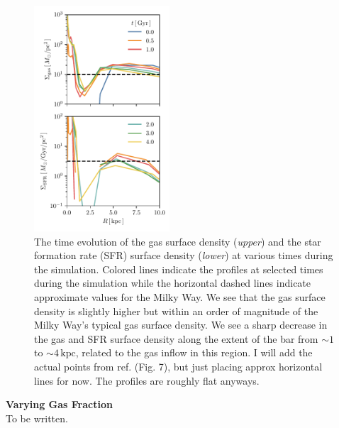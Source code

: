 \documentclass{natureprintstyle}
\begin{document}
\begin{figure}[t!]%
\centering
\includegraphics[width=0.45\textwidth]{fig/fig-surf.pdf}
\caption{The time evolution of the gas surface density (\textit{upper}) and
the star formation rate (SFR) surface density (\textit{lower}) at various
times during the simulation. Colored lines indicate the profiles at selected
times during the simulation while the horizontal dashed lines indicate
approximate values for the Milky Way.\cite{2012ARAA..50..531K} We see that the
gas surface density is slightly higher but within an order of magnitude of the
Milky Way's typical gas surface density. We see a sharp decrease in the gas
and SFR surface density along the extent of the bar from $\sim1$ to
$\sim4\,\textrm{kpc}$, related to the gas inflow in this region. {\color{red}
I will add the actual points from ref.\cite{2012ARAA..50..531K} (Fig. 7), but
just placing approx horizontal lines for now. The profiles are roughly flat
anyways.}}
\label{fig:surf}
\end{figure}

\vspace{12pt}

\noindent
{\bf Varying Gas Fraction}
\\
\noindent
To be written.

\vspace{12pt}
\end{document}
